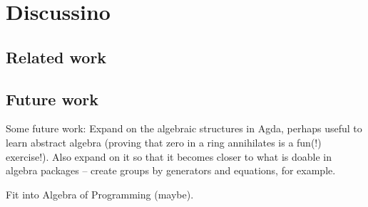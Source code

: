 \section{Discussino}
\subsection{Related work}
\subsection{Future work}
Some future work:
Expand on the algebraic structures in Agda, perhaps useful to learn abstract algebra (proving that zero in a ring annihilates is a fun(!) exercise!). Also expand on it so that it becomes closer to what is doable in algebra packages -- create groups by generators and equations, for example.

Fit into Algebra of Programming (maybe).

